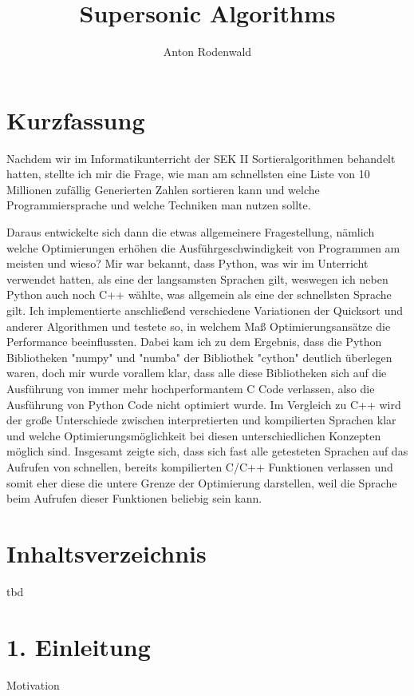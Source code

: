 \documentclass[10pt,a4paper]{article}
\begin{document}
\title{Supersonic Algorithms}
\author{Anton Rodenwald}

\maketitle

\clearpage
\section*{Kurzfassung}
Nachdem wir im Informatikunterricht der SEK II Sortieralgorithmen behandelt hatten,
stellte ich mir die Frage, wie man am schnellsten eine Liste von 10 Millionen zufällig Generierten Zahlen
sortieren kann und welche Programmiersprache und welche Techniken man nutzen sollte.

Daraus entwickelte sich dann die etwas allgemeinere Fragestellung, nämlich welche Optimierungen
erhöhen die Ausführgeschwindigkeit von Programmen am meisten und wieso?
Mir war bekannt, dass Python, was wir im Unterricht verwendet hatten, als eine der langsamsten Sprachen gilt, 
weswegen ich neben Python auch noch C++ wählte, was allgemein als eine der schnellsten Sprache gilt.
Ich implementierte anschließend verschiedene Variationen der Quicksort und anderer Algorithmen und testete so, 
in welchem Maß Optimierungsansätze die Performance beeinflussten.
Dabei kam ich zu dem Ergebnis, dass die Python Bibliotheken "numpy" und "numba" der Bibliothek "cython" deutlich 
überlegen waren, doch mir wurde vorallem klar, dass alle diese Bibliotheken sich auf die Ausführung von immer
mehr hochperformantem C Code verlassen, also die Ausführung von Python Code nicht optimiert wurde.
Im Vergleich zu C++ wird der große Unterschiede zwischen interpretierten und kompilierten Sprachen klar
und welche Optimierungsmöglichkeit bei diesen unterschiedlichen Konzepten möglich sind. 
Insgesamt zeigte sich, dass sich fast alle getesteten Sprachen auf das Aufrufen von schnellen, bereits kompilierten
C/C++ Funktionen verlassen und somit eher diese die untere Grenze der Optimierung darstellen, weil die Sprache beim 
Aufrufen dieser Funktionen beliebig sein kann.

\clearpage
\section*{Inhaltsverzeichnis}
tbd

\clearpage
\section*{1. Einleitung}
Motivation
\end{document}
